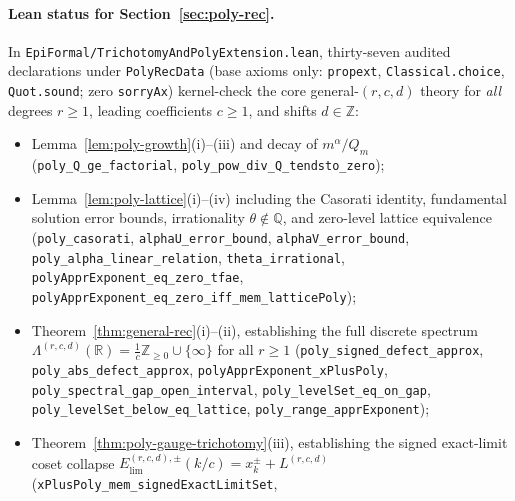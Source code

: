 \documentclass[11pt]{article}
\theoremstyle{definition}
\theoremstyle{remark}
\newcommand{\R}{\mathbb{R}}
\newcommand{\Z}{\mathbb{Z}}
\newcommand{\Q}{\mathbb{Q}}
\newcommand{\Lam}{\Lambda}
\begin{document}
\paragraph{Lean status for Section~\ref{sec:poly-rec}.}
In \texttt{EpiFormal/\allowbreak TrichotomyAndPolyExtension.lean}, thirty-seven
audited declarations under \texttt{PolyRecData} (base axioms only:
\texttt{propext}, \texttt{Classical.choice}, \texttt{Quot.sound}; zero
\texttt{sorryAx}) kernel-check the core general-$(r,c,d)$ theory for
\emph{all} degrees $r\ge1$, leading coefficients $c\ge1$, and shifts $d\in\Z$:
\begin{itemize}[leftmargin=1.8em]
\item Lemma~\ref{lem:poly-growth}(i)--(iii) and decay of $m^\alpha/Q_m$
(\texttt{poly\_\allowbreak Q\_\allowbreak ge\_\allowbreak factorial},
\texttt{poly\_\allowbreak pow\_\allowbreak div\_\allowbreak Q\_\allowbreak tendsto\_\allowbreak zero});
\item Lemma~\ref{lem:poly-lattice}(i)--(iv) including the Casorati identity,
fundamental solution error bounds, irrationality $\theta\notin\Q$, and
zero-level lattice equivalence
(\texttt{poly\_\allowbreak casorati},
\texttt{alphaU\_\allowbreak error\_\allowbreak bound},
\texttt{alphaV\_\allowbreak error\_\allowbreak bound},
\texttt{poly\_\allowbreak alpha\_\allowbreak linear\_\allowbreak relation},
\texttt{theta\_\allowbreak irrational},
\texttt{polyApprExponent\_\allowbreak eq\_\allowbreak zero\_\allowbreak tfae},
\texttt{polyApprExponent\_\allowbreak eq\_\allowbreak zero\_\allowbreak iff\_\allowbreak mem\_\allowbreak latticePoly});
\item Theorem~\ref{thm:general-rec}(i)--(ii), establishing the full discrete
spectrum $\Lam^{(r,c,d)}(\R)=\frac{1}{c}\Z_{\ge0}\cup\{\infty\}$ for all
$r\ge1$
(\texttt{poly\_\allowbreak signed\_\allowbreak defect\_\allowbreak approx},
\texttt{poly\_\allowbreak abs\_\allowbreak defect\_\allowbreak approx},
\texttt{polyApprExponent\_\allowbreak xPlusPoly},
\texttt{poly\_\allowbreak spectral\_\allowbreak gap\_\allowbreak open\_\allowbreak interval},
\texttt{poly\_\allowbreak levelSet\_\allowbreak eq\_\allowbreak on\_\allowbreak gap},
\texttt{poly\_\allowbreak levelSet\_\allowbreak below\_\allowbreak eq\_\allowbreak lattice},
\texttt{poly\_\allowbreak range\_\allowbreak apprExponent});
\item Theorem~\ref{thm:poly-gauge-trichotomy}(iii), establishing the signed
exact-limit coset collapse $E_{\mathrm{lim}}^{(r,c,d),\pm}(k/c)=x_k^\pm+L^{(r,c,d)}$
(\texttt{xPlusPoly\_\allowbreak mem\_\allowbreak signedExactLimitSet},

\end{itemize}
\end{document}
